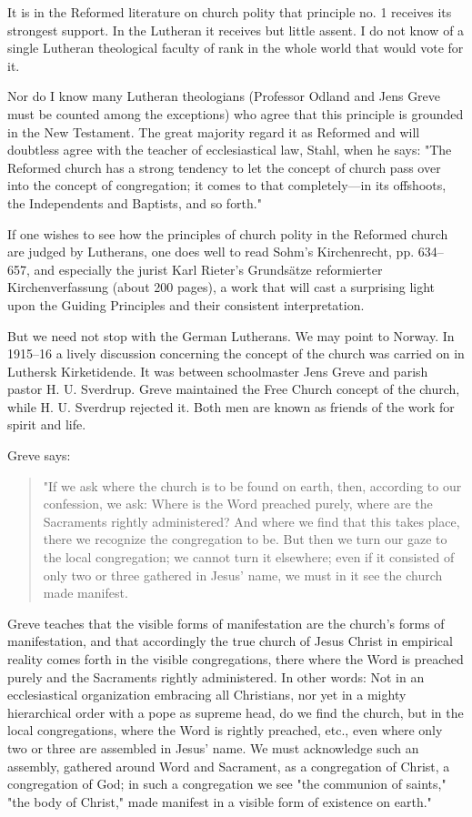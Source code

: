 It is in the Reformed literature on church polity that principle no. 1 receives its strongest support. In the Lutheran it receives but little assent. I do not know of a single Lutheran theological faculty of rank in the whole world that would vote for it.

Nor do I know many Lutheran theologians (Professor Odland and Jens Greve must be counted among the exceptions) who agree that this principle is grounded in the New Testament. The great majority regard it as Reformed and will doubtless agree with the teacher of ecclesiastical law, Stahl, when he says: "The Reformed church has a strong tendency to let the concept of church pass over into the concept of congregation; it comes to that completely—in its offshoots, the Independents and Baptists, and so forth."

If one wishes to see how the principles of church polity in the Reformed church are judged by Lutherans, one does well to read Sohm’s Kirchenrecht, pp. 634–657, and especially the jurist Karl Rieter’s Grundsätze reformierter Kirchenverfassung (about 200 pages), a work that will cast a surprising light upon the Guiding Principles and their consistent interpretation.

But we need not stop with the German Lutherans. We may point to Norway. In 1915–16 a lively discussion concerning the concept of the church was carried on in Luthersk Kirketidende. It was between schoolmaster Jens Greve and parish pastor H. U. Sverdrup. Greve maintained the Free Church concept of the church, while H. U. Sverdrup rejected it. Both men are known as friends of the work for spirit and life.

Greve says:

\begin{quote}
"If we ask where the church is to be found on earth, then, according to our confession, we ask: Where is the Word preached purely, where are the Sacraments rightly administered? And where we find that this takes place, there we recognize the congregation to be. But then we turn our gaze to the local congregation; we cannot turn it elsewhere; even if it consisted of only two or three gathered in Jesus’ name, we must in it see the church made manifest.
\end{quote}

Greve teaches that the visible forms of manifestation are the church’s forms of manifestation, and that accordingly the true church of Jesus Christ in empirical reality comes forth in the visible congregations, there where the Word is preached purely and the Sacraments rightly administered. In other words: Not in an ecclesiastical organization embracing all Christians, nor yet in a mighty hierarchical order with a pope as supreme head, do we find the church, but in the local congregations, where the Word is rightly preached, etc., even where only two or three are assembled in Jesus’ name. We must acknowledge such an assembly, gathered around Word and Sacrament, as a congregation of Christ, a congregation of God; in such a congregation we see "the communion of saints," "the body of Christ," made manifest in a visible form of existence on earth."



